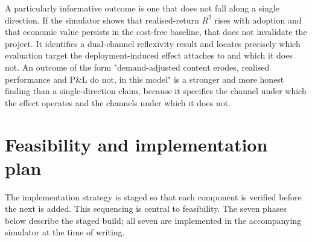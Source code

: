 \documentclass[11pt]{article}
\begin{document}
A particularly informative outcome is one that does not fall along a single direction. If the simulator shows that realised-return $R^{2}$ rises with adoption and that economic value persists in the cost-free baseline, that does not invalidate the project. It identifies a dual-channel reflexivity result and locates precisely which evaluation target the deployment-induced effect attaches to and which it does not. An outcome of the form "demand-adjusted content erodes, realised performance and P\&L do not, in this model" is a stronger and more honest finding than a single-direction claim, because it specifies the channel under which the effect operates and the channels under which it does not.


\section{Feasibility and implementation plan}

The implementation strategy is staged so that each component is verified before the next is added. This sequencing is central to feasibility. The seven phases below describe the staged build; all seven are implemented in the accompanying simulator at the time of writing.
\end{document}
